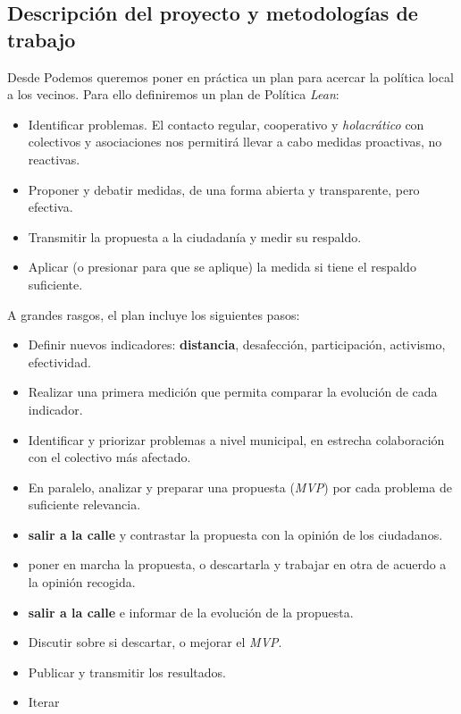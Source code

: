 \documentclass[11pt]{article}
\begin{document}
\subsection{Descripción del proyecto y metodologías de trabajo}
\label{sec-2-5}

Desde Podemos queremos poner en práctica un plan para acercar la política local a los vecinos.
Para ello definiremos un plan de Política \emph{Lean}:
\begin{itemize}
\item Identificar problemas. El contacto regular, cooperativo y \emph{holacrático} con colectivos y asociaciones nos permitirá llevar a cabo medidas proactivas, no reactivas.
\item Proponer y debatir medidas, de una forma abierta y transparente, pero efectiva.
\item Transmitir la propuesta a la ciudadanía y medir su respaldo.
\item Aplicar (o presionar para que se aplique) la medida si tiene el respaldo suficiente.
\end{itemize}

A grandes rasgos, el plan incluye los siguientes pasos:
\begin{itemize}
\item Definir nuevos indicadores: \textbf{distancia}, desafección, participación, activismo, efectividad.
\item Realizar una primera medición que permita comparar la evolución de cada indicador.
\item Identificar y priorizar problemas a nivel municipal, en estrecha co\-la\-bo\-ra\-ción con el colectivo más afectado.
\item En paralelo, analizar y preparar una propuesta (\emph{MVP}) por cada pro\-ble\-ma de suficiente relevancia.
\item \textbf{salir a la calle} y contrastar la propuesta con la opinión de los ciudadanos.
\item poner en marcha la propuesta, o descartarla y trabajar en otra de acuerdo a la opinión recogida.
\item \textbf{salir a la calle} e informar de la evolución de la propuesta.
\item Discutir sobre si descartar, o mejorar el \emph{MVP}.
\item Publicar y transmitir los resultados.
\item Iterar
\end{itemize}
\end{document}
